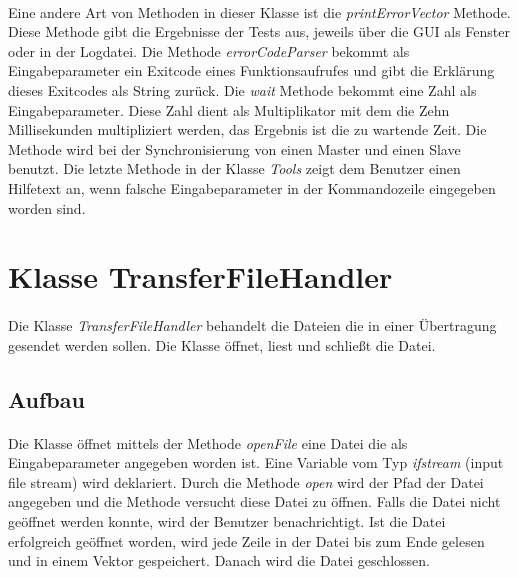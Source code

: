 \paragraph{}
Eine andere Art von Methoden in dieser Klasse ist die \textit{printErrorVector} Methode. Diese Methode gibt die Ergebnisse der Tests aus, jeweils über die GUI als Fenster oder in der Logdatei. Die Methode \textit{errorCodeParser} bekommt als Eingabeparameter ein Exitcode eines Funktionsaufrufes und gibt die Erklärung dieses Exitcodes als String zurück. Die \textit{wait} Methode bekommt eine Zahl als Eingabeparameter. Diese Zahl dient als Multiplikator mit dem die Zehn Millisekunden multipliziert werden, das Ergebnis ist die zu wartende Zeit. Die Methode wird bei der Synchronisierung von einen Master und einen Slave benutzt. Die letzte Methode in der Klasse \textit{Tools} zeigt dem Benutzer einen Hilfetext an, wenn falsche Eingabeparameter in der Kommandozeile eingegeben worden sind.



\newpage


\section{Klasse TransferFileHandler}
\paragraph{}
Die Klasse \textit{TransferFileHandler} behandelt die Dateien die in einer Übertragung gesendet werden sollen. Die Klasse öffnet, liest und schließt die Datei.

\subsection{Aufbau}
\paragraph{}
Die Klasse öffnet mittels der Methode \textit{openFile} eine Datei die als Eingabeparameter angegeben worden ist. Eine Variable vom Typ \textit{ifstream} (input file stream) wird deklariert. Durch die Methode \textit{open} wird der Pfad der Datei angegeben und die Methode versucht diese Datei zu öffnen. Falls die Datei nicht geöffnet werden konnte, wird der Benutzer benachrichtigt. Ist die Datei erfolgreich geöffnet worden, wird jede Zeile in der Datei bis zum Ende gelesen und in einem Vektor gespeichert. Danach wird die Datei geschlossen.\\


